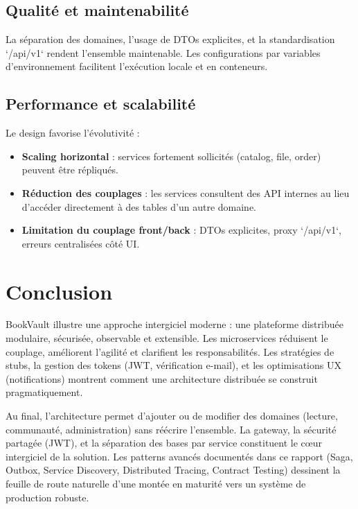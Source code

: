 \documentclass[12pt,a4paper]{report}
\begin{document}
\section{Qualité et maintenabilité}
La séparation des domaines, l'usage de DTOs explicites, et la standardisation `/api/v1` rendent l'ensemble maintenable. Les configurations par variables d'environnement facilitent l'exécution locale et en conteneurs.\par

\section{Performance et scalabilité}
Le design favorise l'évolutivité :
\begin{itemize}
  \item \textbf{Scaling horizontal} : services fortement sollicités (catalog, file, order) peuvent être répliqués.
  \item \textbf{Réduction des couplages} : les services consultent des API internes au lieu d'accéder directement à des tables d'un autre domaine.
  \item \textbf{Limitation du couplage front/back} : DTOs explicites, proxy `/api/v1`, erreurs centralisées côté UI.
\end{itemize}

\chapter{Conclusion}
BookVault illustre une approche intergiciel moderne : une plateforme distribuée modulaire, sécurisée, observable et extensible. Les microservices réduisent le couplage, améliorent l'agilité et clarifient les responsabilités. Les stratégies de stubs, la gestion des tokens (JWT, vérification e-mail), et les optimisations UX (notifications) montrent comment une architecture distribuée se construit pragmatiquement.\par
\par
Au final, l'architecture permet d'ajouter ou de modifier des domaines (lecture, communauté, administration) sans réécrire l'ensemble. La gateway, la sécurité partagée (JWT), et la séparation des bases par service constituent le cœur intergiciel de la solution. Les patterns avancés documentés dans ce rapport (Saga, Outbox, Service Discovery, Distributed Tracing, Contract Testing) dessinent la feuille de route naturelle d'une montée en maturité vers un système de production robuste.\par
\end{document}
